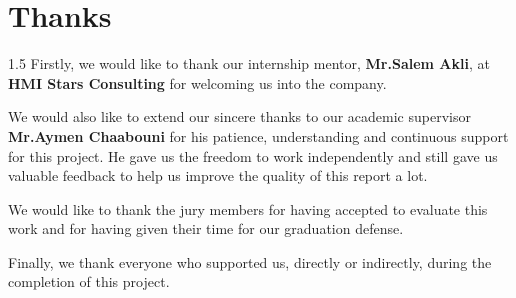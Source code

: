 \chapter*{Thanks}
\begin{spacing}{1.5}
Firstly, we would like to thank our internship mentor, \textbf{Mr.Salem Akli}, at \textbf{HMI Stars Consulting} for welcoming us into the company.

We would also like to extend our sincere thanks to our academic supervisor \textbf{Mr.Aymen Chaabouni} for his patience, understanding and continuous support for this project. He gave us the freedom to work independently and still gave us valuable feedback to help us improve the quality of this report a lot.

We would like to thank the jury members for having accepted to evaluate this work and for having given their time for our graduation defense.

Finally, we thank everyone who supported us, directly or indirectly, during the completion of this project.

\end{spacing}
